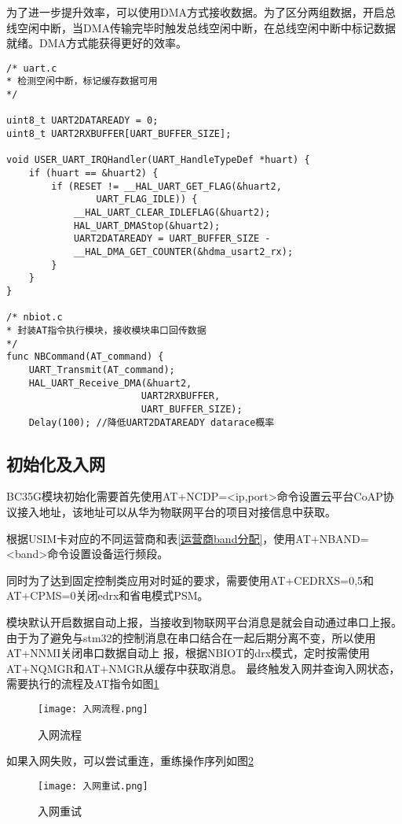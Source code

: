 为了进一步提升效率，可以使用DMA方式接收数据。为了区分两组数据，开启总线空闲中断，当DMA传输完毕时触发总线空闲中断，在总线空闲中断中标记数据就绪。DMA方式能获得更好的效率。

\begin{lstlisting}
/* uart.c
* 检测空闲中断，标记缓存数据可用
*/

uint8_t UART2DATAREADY = 0;
uint8_t UART2RXBUFFER[UART_BUFFER_SIZE];

void USER_UART_IRQHandler(UART_HandleTypeDef *huart) {
    if (huart == &huart2) {
        if (RESET != __HAL_UART_GET_FLAG(&huart2, 
                UART_FLAG_IDLE)) {
            __HAL_UART_CLEAR_IDLEFLAG(&huart2);
            HAL_UART_DMAStop(&huart2);
            UART2DATAREADY = UART_BUFFER_SIZE - 
            __HAL_DMA_GET_COUNTER(&hdma_usart2_rx);
        }
    }
}

/* nbiot.c
* 封装AT指令执行模块，接收模块串口回传数据
*/
func NBCommand(AT_command) {
    UART_Transmit(AT_command);
    HAL_UART_Receive_DMA(&huart2, 
                        UART2RXBUFFER, 
                        UART_BUFFER_SIZE);
    Delay(100); //降低UART2DATAREADY datarace概率
\end{lstlisting}    

\subsection{初始化及入网}
BC35G模块初始化需要首先使用AT+NCDP=<ip,port>命令设置云平台CoAP协议接入地址，该地址可以从华为物联网平台的项目对接信息中获取。

根据USIM卡对应的不同运营商和表\ref{运营商band分配}，使用AT+NBAND=<band>命令设置设备运行频段。

同时为了达到固定控制类应用对时延的要求，需要使用AT+CEDRXS=0,5和AT+CPMS=0关闭edrx和省电模式PSM。

模块默认开启数据自动上报，当接收到物联网平台消息是就会自动通过串口上报。由于为了避免与stm32的控制消息在串口结合在一起后期分离不变，所以使用AT+NNMI关闭串口数据自动上
报，根据NBIOT的drx模式，定时按需使用AT+NQMGR和AT+NMGR从缓存中获取消息。
最终触发入网并查询入网状态，需要执行的流程及AT指令如图\ref{入网流程}

\begin{figure}[H]
    \centering
	\texttt{[image: 入网流程.png]}
	\caption{入网流程}
	\label{入网流程}
\end{figure}


如果入网失败，可以尝试重连，重练操作序列如图\ref{入网重试}

\begin{figure}[H]
    \centering
	\texttt{[image: 入网重试.png]}
	\caption{入网重试}
	\label{入网重试}
\end{figure}


